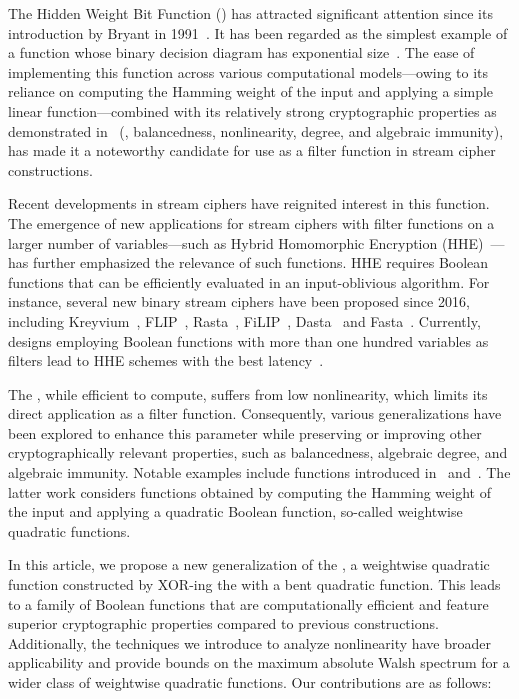 \documentclass[11pt]{llncs}
\begin{document}
The Hidden Weight Bit Function (\hwbf{}) has attracted significant attention since its introduction by Bryant in 1991~\cite{IEEE:Bryant91}. It has been regarded as the simplest example of a function whose binary decision diagram has exponential size~\cite{IEEE:Bryant91,TIA:BoLSW99}. The ease of implementing this function across various computational models—owing to its reliance on computing the Hamming weight of the input and applying a simple linear function—combined with its relatively strong cryptographic properties as demonstrated in~\cite{DAM:WCST14} (\eg, balancedness, nonlinearity, degree, and algebraic immunity), has made it a noteworthy candidate for use as a filter function in stream cipher constructions.

Recent developments in stream ciphers have reignited interest in this function. The emergence of new applications for stream ciphers with filter functions on a larger number of variables—such as Hybrid Homomorphic Encryption (\textsf{HHE})~\cite{CCS:NaeLauVai11}—has further emphasized the relevance of such functions. \textsf{HHE} requires Boolean functions that can be efficiently evaluated in an input-oblivious algorithm. For instance, several new binary stream ciphers have been proposed since 2016, including Kreyvium~\cite{JOC:CCFLNP18}, \textsf{FLIP}~\cite{EC:MJSC16}, Rasta~\cite{C:Rasta}, \textsf{FiLIP}~\cite{INDO:MCJS19}, Dasta~\cite{TOSC:BeiLea20} and Fasta~\cite{CTRSA:CidIndRad22}. 
Currently, designs employing Boolean functions with more than one hundred variables as filters lead to \textsf{HHE} schemes with the best latency~\cite{INDO:HofMeaRic20,CCS:CDPP22,CIC:MeaParPei24,eprint:AGHM24}.

The \hwbf{}, while efficient to compute, suffers from low nonlinearity, which limits its direct application as a filter function. Consequently, various generalizations have been explored to enhance this parameter while preserving or improving other cryptographically relevant properties, such as balancedness, algebraic degree, and algebraic immunity. Notable examples include functions introduced in~\cite{IEEE:Carlet22,eprint:CarPar23} and~\cite{DAM:MeaOza24}. The latter work considers functions obtained by computing the Hamming weight of the input and applying a quadratic Boolean function, so-called weightwise quadratic functions.

\bigskip

In this article, we propose a new generalization of the \hwbf{}, a weightwise quadratic function constructed by \textsf{XOR}-ing the \hwbf{} with a bent quadratic function. This leads to a family of Boolean functions that are computationally efficient and feature superior cryptographic properties compared to previous constructions. 
Additionally, the techniques we introduce to analyze nonlinearity have broader applicability and provide bounds on the maximum absolute Walsh spectrum for a wider class of weightwise quadratic functions. Our contributions are as follows:
\end{document}
